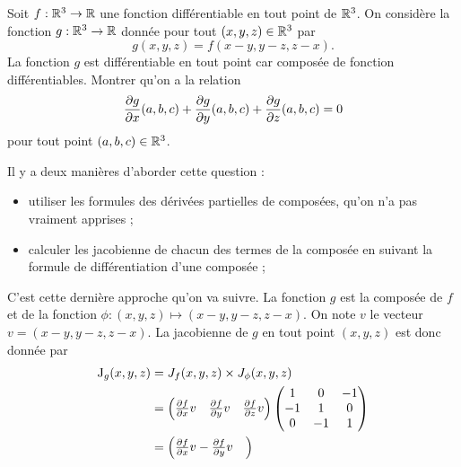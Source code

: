 \documentclass[11pt, a4paper]{article}
\begin{document}
\begin{question}
  Soit $f : \mathbb{R}^3 \to \mathbb{R}$ une fonction différentiable en tout point de
  $\mathbb{R}^3$. On considère la fonction $g : \mathbb{R}^3 \to \mathbb{R}$ donnée pour tout
  $(x, y, z) \in \mathbb{R}^3$ par
  \[
  g(x, y, z) = f(x-y, y-z, z-x).
  \]
  La fonction $g$ est différentiable en tout point car composée de
  fonction différentiables. Montrer qu'on a la relation
  \[
  \frac{\partial g}{\partial x}(a,b, c) + \frac{\partial g}{\partial y}(a, b, c) + \frac{\partial
    g}{\partial z}(a, b, c) = 0
  \]
  pour tout point $(a, b, c) \in \mathbb{R}^3$. 
\end{question}

\begin{solution}
  Il y a deux manières d'aborder cette question : 
  \begin{itemize}
  \item[\textbullet]
    utiliser les formules des dérivées partielles de composées, qu'on
    n'a pas vraiment apprises ;
  \item[\textbullet]
    calculer les jacobienne de chacun des termes de la composée en
    suivant la formule de différentiation d'une composée ;
  \end{itemize}
  C'est cette dernière approche qu'on va suivre. La fonction $g$ est
  la composée de $f$ et de la fonction
  $\phi : (x, y, z) \mapsto (x-y, y-z, z-x)$. On note $v$ le vecteur
  $v = (x-y, y-z, z-x)$. La jacobienne de $g$ en tout point
  $(x, y, z)$ est donc donnée par
  \begin{align}
    \mathrm{J}_g(x, y, z) & = J_{f}(x, y, z)\times J_\phi(x, y, z)\\
                          & = 
                            \begin{pmatrix}
                              \frac{\partial f}{\partial x}v & 
                              \frac{\partial f}{\partial y}v & 
                              \frac{\partial f}{\partial z}v 
                            \end{pmatrix}
                            \begin{pmatrix}
                              1 & 0 & -1 \\
                              -1 & 1 & 0 \\
                              0 & -1 & 1
                            \end{pmatrix}\\
                          & = 
                            \begin{pmatrix} 
                              \frac{\partial f}{\partial x}v 
                              - \frac{\partial f}{\partial y}v &

\end{pmatrix}
\end{align}
\end{solution}
\end{document}
